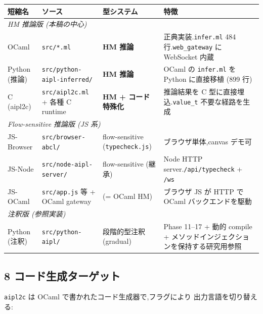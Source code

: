 \documentclass[11pt,a4paper]{article}
\newcommand{\code}[1]{\texttt{\small #1}}
\begin{document}
\begin{longtable}{p{2.7cm} p{3.5cm} p{4.0cm} p{5.0cm}}
  \toprule
  \textbf{短縮名} & \textbf{ソース} & \textbf{型システム} & \textbf{特徴} \\
  \midrule
  \endhead
  \multicolumn{4}{l}{\textit{HM 推論版 (本稿の中心)}} \\
  \midrule
  OCaml           & \code{src/*.ml}                & \textbf{HM 推論}     & 正典実装.\code{infer.ml} 484 行.\code{web\_gateway} に WebSocket 内蔵 \\
  Python (推論)   & \code{src/python-aipl-inferred/} & \textbf{HM 推論}    & OCaml の \code{infer.ml} を Python に直接移植 (899 行) \\
  C (aipl2c)      & \code{src/aipl2c.ml} + 各種 C runtime & \textbf{HM + コード特殊化} & 推論結果を C 型に直接埋込.\code{value\_t} 不要な経路を生成 \\
  \midrule
  \multicolumn{4}{l}{\textit{Flow-sensitive 推論版 (JS 系)}} \\
  \midrule
  JS-Browser      & \code{src/browser-abcl/}       & flow-sensitive (\code{typecheck.js}) & ブラウザ単体,canvas デモ可 \\
  JS-Node         & \code{src/node-aipl-server/}   & flow-sensitive (継承) & Node HTTP server.\code{/api/typecheck} + \code{/ws} \\
  JS-OCaml        & \code{src/app.js} 等 + OCaml gateway & (= OCaml HM)  & ブラウザ JS が HTTP で OCaml バックエンドを駆動 \\
  \midrule
  \multicolumn{4}{l}{\textit{注釈版 (参照実装)}} \\
  \midrule
  Python (注釈)   & \code{src/python-aipl/}        & 段階的型注釈 (gradual) & Phase 11--17 + 動的 compile + メソッドインジェクションを保持する研究用参照 \\
  \bottomrule
\end{longtable}

\subsection{8 コード生成ターゲット}

\code{aipl2c} は OCaml で書かれたコード生成器で,フラグにより
出力言語を切り替える:
\end{document}
